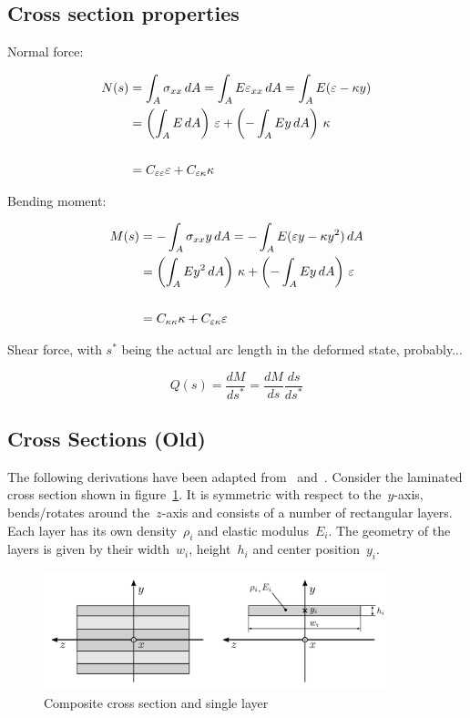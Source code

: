 \newpage
\subsection{Cross section properties}

Normal force:

\begin{align}
N(s) &= \int_A \sigma_{xx}\,dA = \int_A E\varepsilon_{xx}\,dA = \int_A E(\varepsilon - \kappa y) \notag \\
&= \left(\int_A E\,dA\right)\,\varepsilon + \left(-\int_A Ey\,dA\right)\,\kappa \notag \\
\notag \\
&= C_{\varepsilon\varepsilon}\varepsilon + C_{\varepsilon\kappa}\kappa
\end{align}

Bending moment:

\begin{align}
M(s) &= -\int_A \sigma_{xx}y\,dA = -\int_A E(\varepsilon y - \kappa y^2)\,dA \notag \\
&= \left(\int_A Ey^2\,dA\right)\,\kappa + \left(-\int_A Ey\,dA\right)\,\varepsilon \notag \\
\notag \\
&= C_{\kappa\kappa}\kappa + C_{\varepsilon\kappa}\varepsilon
\end{align}

Shear force, with $s^*$ being the actual arc length in the deformed state, probably...

\begin{equation}
Q(s) = \frac{dM}{ds^*} = \frac{dM}{ds}\frac{ds}{ds^*}
\end{equation}

\newpage
\subsection{Cross Sections (Old)}

The following derivations have been adapted from~\cite{bib:tm2} and~\cite{bib:wiki-sandwich}. Consider the laminated cross section shown in figure~\ref{fig:composite-sections-1}.
It is symmetric with respect to the~$y$-axis, bends/rotates around the~$z$-axis and consists of a number of rectangular layers. Each layer has its own density~$\rho_i$ and elastic modulus~$E_i$.
The geometry of the layers is given by their width~$w_i$, height~$h_i$ and center position~$y_i$.

\begin{figure}[h]
\centering
\includegraphics[width=0.9\textwidth]{figures/elements/composite-sections-1}
\caption{Composite cross section and single layer}
\label{fig:composite-sections-1}
\end{figure}

